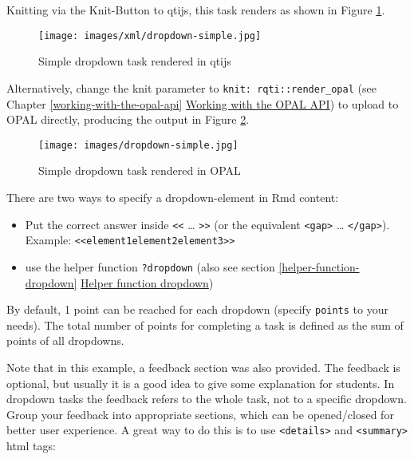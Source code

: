 \documentclass[twoside]{tufte-book}
\providecommand{\tightlist}{%
  \setlength{\itemsep}{0pt}\setlength{\parskip}{0pt}}
\begin{document}
Knitting via the Knit-Button to qtijs, this task renders as shown in Figure \ref{dd1qtijs}.

\begin{figure}
\centering
\texttt{[image: images/xml/dropdown-simple.jpg]}
\caption{\label{dd1qtijs}Simple dropdown task rendered in qtijs}
\end{figure}

\noindent \noindent Alternatively, change the knit parameter to \texttt{knit:\ rqti::render\_opal} (see Chapter \ref{working-with-the-opal-api} \href{api_opal.html}{Working with the OPAL API}) to upload to OPAL directly, producing the output in Figure \ref{dd1opal}.

\begin{figure}
\centering
\texttt{[image: images/dropdown-simple.jpg]}
\caption{\label{dd1opal}Simple dropdown task rendered in OPAL}
\end{figure}

There are two ways to specify a dropdown-element in Rmd content:

\begin{itemize}
\tightlist
\item
  Put the correct answer inside \texttt{\textless{}\textless{}} \ldots{} \texttt{\textgreater{}\textgreater{}} (or the equivalent \texttt{\textless{}gap\textgreater{}} \ldots{} \texttt{\textless{}/gap\textgreater{}}). Example: \texttt{\textless{}\textless{}element1\textbar{}element2\textbar{}element3\textgreater{}\textgreater{}}
\item
  use the helper function \texttt{?dropdown} (also see section \ref{helper-function-dropdown} \hyperref[helper-function-dropdown]{Helper function dropdown})
\end{itemize}

By default, 1 point can be reached for each dropdown (specify \texttt{points} to your needs). The total number of points for completing a task is defined as the sum of points of all dropdowns.

Note that in this example, a feedback section was also provided. The feedback is
optional, but usually it is a good idea to give some explanation for students. In dropdown tasks the feedback refers to the whole task, not to a specific dropdown. Group your feedback into appropriate sections, which can be opened/closed for better user experience. A great way to do this is to use \texttt{\textless{}details\textgreater{}} and \texttt{\textless{}summary\textgreater{}} html tags:
\end{document}
